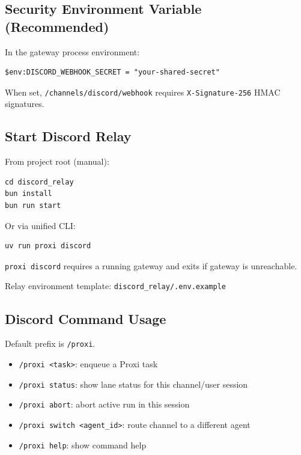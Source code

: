 \documentclass{article}
\begin{document}
\subsection{Security Environment Variable (Recommended)}

In the gateway process environment:

\begin{verbatim}
$env:DISCORD_WEBHOOK_SECRET = "your-shared-secret"
\end{verbatim}

When set, \texttt{/channels/discord/webhook} requires \texttt{X-Signature-256} HMAC signatures.

\subsection{Start Discord Relay}

From project root (manual):

\begin{verbatim}
cd discord_relay
bun install
bun run start
\end{verbatim}

Or via unified CLI:

\begin{verbatim}
uv run proxi discord
\end{verbatim}

\texttt{proxi discord} requires a running gateway and exits if gateway is unreachable.

Relay environment template: \texttt{discord\_relay/.env.example}

\subsection{Discord Command Usage}

Default prefix is \texttt{/proxi}.

\begin{itemize}
	\item \texttt{/proxi <task>}: enqueue a Proxi task
	\item \texttt{/proxi status}: show lane status for this channel/user session
	\item \texttt{/proxi abort}: abort active run in this session
	\item \texttt{/proxi switch <agent\_id>}: route channel to a different agent
	\item \texttt{/proxi help}: show command help
\end{itemize}
\end{document}
